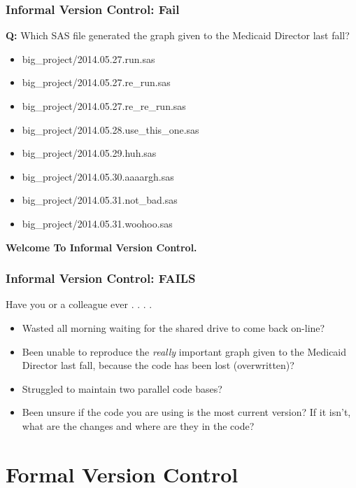 \documentclass{beamer}
\begin{document}
\begin{frame} %
  \frametitle{Informal Version Control: Fail} 

  \textbf{Q:} Which SAS file generated the graph given to the
  Medicaid Director last fall?

  \bigskip
  \begin{itemize}
  \item big\_project/2014.05.27.run.sas
  \item big\_project/2014.05.27.re\_run.sas
  \item big\_project/2014.05.27.re\_re\_run.sas
  \item big\_project/2014.05.28.use\_this\_one.sas
  \item big\_project/2014.05.29.huh.sas
  \item big\_project/2014.05.30.aaaargh.sas
  \item big\_project/2014.05.31.not\_bad.sas
  \item big\_project/2014.05.31.woohoo.sas
  \end{itemize}

  \bigskip
  \begin{center}
  \textbf{Welcome To Informal Version Control.}
  \end{center}
  
\end{frame}

\begin{frame}  %
  \frametitle{Informal Version Control: FAILS}
  {\large Have you or a colleague ever . . . . }
  \bigskip
  \begin{itemize}
  \item Wasted all morning waiting for the shared drive to come back
    on-line?
  \item Been unable to reproduce the \emph{really} important graph
    given to the Medicaid Director last fall, because the code has
    been lost (overwritten)?
  \item Struggled to maintain two parallel code bases?
  \item Been unsure if the code you are using is the most current
    version? If it isn't, what are the changes and where are they in
    the code?
  \end{itemize}
\end{frame}


\section{Formal Version Control} %
\end{document}
